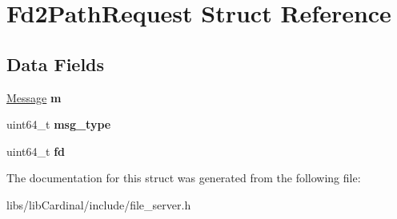 \hypertarget{structFd2PathRequest}{}\section{Fd2\+Path\+Request Struct Reference}
\label{structFd2PathRequest}
\subsection*{Data Fields}
\begin{DoxyCompactItemize}
\item 
\hyperlink{structMessage}{Message} {\bfseries m}\hypertarget{structFd2PathRequest_a7a85f9213e1cb01e13e9884856a4fe0f}{}\label{structFd2PathRequest_a7a85f9213e1cb01e13e9884856a4fe0f}

\item 
uint64\+\_\+t {\bfseries msg\+\_\+type}\hypertarget{structFd2PathRequest_a675bd8275af26db8a938005efd18ecfe}{}\label{structFd2PathRequest_a675bd8275af26db8a938005efd18ecfe}

\item 
uint64\+\_\+t {\bfseries fd}\hypertarget{structFd2PathRequest_ace390952c52aa3a4308bd01cd7b21d79}{}\label{structFd2PathRequest_ace390952c52aa3a4308bd01cd7b21d79}

\end{DoxyCompactItemize}


The documentation for this struct was generated from the following file\+:\begin{DoxyCompactItemize}
\item 
libs/lib\+Cardinal/include/file\+\_\+server.\+h\end{DoxyCompactItemize}

